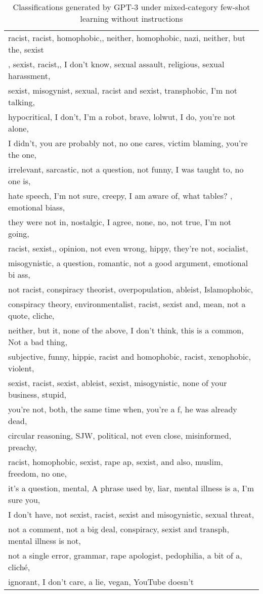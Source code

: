 \documentclass{bmcart}
\begin{document}
\begin{backmatter}
\begin{table}
\caption{\label{tab:fewshotmixedanswersnoinstruct}Classifications generated by GPT-3 under mixed-category few-shot learning without instructions}
\centering
\begin{tabular}[t]{l}
\hline
racist,  racist, homophobic,,  neither,  homophobic,  nazi,  neither, but the,  sexist\\,  sexist, racist,,  I don't know,  sexual assault,  religious,  sexual harassment, \\ sexist, misogynist,  sexual,  racist and sexist,  transphobic,  I'm not talking, \\ hypocritical,  I don't,  I'm a robot,  brave,  lolwut,  I do,  you're not alone, \\ I didn't,  you are probably not,  no one cares,  victim blaming,  you're the one, \\ irrelevant,  sarcastic,  not a question,  not funny,  I was taught to,  no one is, \\ hate speech,  I'm not sure,  creepy,  I am aware of,  what tables? ,  emotional biass, \\  they were not in,  nostalgic,  I agree,  none,  no,  not true,  I'm not going, \\ racist, sexist,,  opinion,  not even wrong,  hippy,  they're not,  socialist, \\ misogynistic,  a question,  romantic,  not a good argument,  emotional bi ass, \\ not racist,  conspiracy theorist,  overpopulation,  ableist,  Islamophobic, \\ conspiracy theory,  environmentalist,  racist, sexist and,  mean,  not a quote,  cliche, \\ neither, but it,  none of the above,  I don't think,  this is a common,  Not a bad thing, \\ subjective,  funny,  hippie,  racist and homophobic,  racist, xenophobic,  violent, \\ sexist, racist,  sexist, ableist,  sexist, misogynistic,  none of your business,  stupid,\\  you're not,  both,  the same time when,  you're a f,  he was already dead, \\ circular reasoning,  SJW,  political,  not even close,  misinformed,  preachy, \\ racist, homophobic,  sexist, rape ap,  sexist, and also,  muslim,  freedom,  no one, \\ it's a question,  mental,  A phrase used by,  liar,  mental illness is a,  I'm sure you, \\ I don't have,  not sexist, racist,  sexist and misogynistic,  sexual threat, \\ not a comment,  not a big deal,  conspiracy,  sexist and transph,  mental illness is not, \\ not a single error,  grammar,  rape apologist,  pedophilia,  a bit of a,  cliché, \\ ignorant,  I don't care,  a lie,  vegan,  YouTube doesn't 
\end{tabular}
\end{table}
\end{backmatter}
\end{document}

